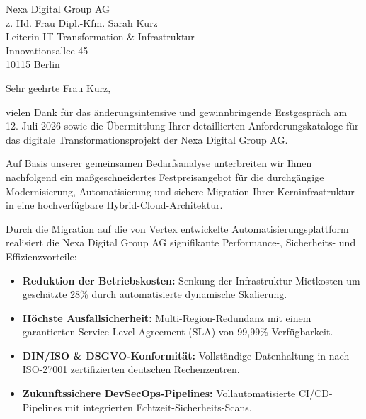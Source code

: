 \documentclass[11pt,a4paper]{dinbrief}
\date{23. Juli 2026}
\begin{document}
\begin{letter}{%
  Nexa Digital Group AG\\
  z. Hd. Frau Dipl.-Kfm. Sarah Kurz\\
  Leiterin IT-Transformation \& Infrastruktur\\
  Innovationsallee 45\\
  10115 Berlin
}

\subject{\textcolor{navyprimary}{\textbf{Angebot: Modernisierung \& Migration der Enterprise Cloud-Infrastruktur}}}

\opening{Sehr geehrte Frau Kurz,}

vielen Dank für das änderungsintensive und gewinnbringende Erstgespräch am 12. Juli 2026 sowie die Übermittlung Ihrer detaillierten Anforderungskataloge für das digitale Transformationsprojekt der Nexa Digital Group AG.

Auf Basis unserer gemeinsamen Bedarfsanalyse unterbreiten wir Ihnen nachfolgend ein maßgeschneidertes Festpreisangebot für die durchgängige Modernisierung, Automatisierung und sichere Migration Ihrer Kerninfrastruktur in eine hochverfügbare Hybrid-Cloud-Architektur.

\vspace{0.2cm}
\begin{tcolorbox}[%
  colback=lightbg,%
  colframe=navyprimary,%
  arc=3pt,%
  boxrule=0.8pt,%
  top=6pt,bottom=6pt,left=8pt,right=8pt,%
  title=\textbf{\textcolor{white}{\faCheckCircle~Projektziele \& Strategischer Nutzen für Nexa Digital}}%
]
\textcolor{darkslate}{%
Durch die Migration auf die von Vertex entwickelte Automatisierungsplattform realisiert die Nexa Digital Group AG signifikante Performance-, Sicherheits- und Effizienzvorteile:
\begin{itemize}[leftmargin=1.5em,itemsep=2pt,parsep=0pt,label=\textcolor{accentteal}{\small\faAngleRight}]
  \item \textbf{Reduktion der Betriebskosten:} Senkung der Infrastruktur-Mietkosten um geschätzte 28\% durch automatisierte dynamische Skalierung.
  \item \textbf{Höchste Ausfallsicherheit:} Multi-Region-Redundanz mit einem garantierten Service Level Agreement (SLA) von 99,99\% Verfügbarkeit.
  \item \textbf{DIN/ISO \& DSGVO-Konformität:} Vollständige Datenhaltung in nach ISO-27001 zertifizierten deutschen Rechenzentren.
  \item \textbf{Zukunftssichere DevSecOps-Pipelines:} Vollautomatisierte CI/CD-Pipelines mit integrierten Echtzeit-Sicherheits-Scans.
\end{itemize}
}
\end{tcolorbox}


\end{letter}
\end{document}
